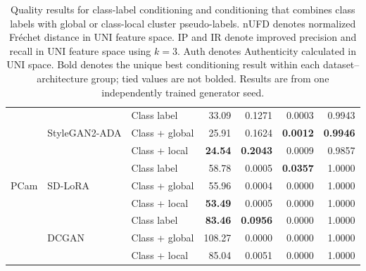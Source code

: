 \begin{table}[htbp]
\begin{tabular}{lllrrrr}
\midrule
\multirow{9}{*}{PCam} & \multirow{3}{*}{StyleGAN2-ADA} & Class label & 33.09 & 0.1271 & 0.0003 & 0.9943 \\
 &  & Class + global & 25.91 & 0.1624 & \textbf{0.0012} & \textbf{0.9946} \\
 &  & Class + local & \textbf{24.54} & \textbf{0.2043} & 0.0009 & 0.9857 \\
\cmidrule(lr){2-7}
 & \multirow{3}{*}{SD-LoRA} & Class label & 58.78 & 0.0005 & \textbf{0.0357} & 1.0000 \\
 &  & Class + global & 55.96 & 0.0004 & 0.0000 & 1.0000 \\
 &  & Class + local & \textbf{53.49} & 0.0005 & 0.0000 & 1.0000 \\
\cmidrule(lr){2-7}
 & \multirow{3}{*}{DCGAN} & Class label & \textbf{83.46} & \textbf{0.0956} & 0.0000 & 1.0000 \\
 &  & Class + global & 108.27 & 0.0000 & 0.0000 & 1.0000 \\
 &  & Class + local & 85.04 & 0.0051 & 0.0000 & 1.0000 \\
\bottomrule
\end{tabular}
\caption{Quality results for class-label conditioning and conditioning that combines class labels with global or class-local cluster pseudo-labels. nUFD denotes normalized Fr\'echet distance in UNI feature space. IP and IR denote improved precision and recall in UNI feature space using $k=3$. Auth denotes Authenticity calculated in UNI space. Bold denotes the unique best conditioning result within each dataset--architecture group; tied values are not bolded. Results are from one independently trained generator seed.}
\label{tab:rq2-normalized-quality}
\end{table}
